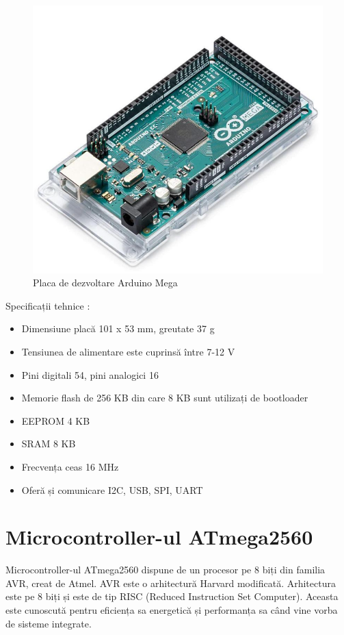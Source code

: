 \begin{figure}[H]
\includegraphics[width=0.7\linewidth]{images/arduino_mega.png}
\caption{Placa de dezvoltare Arduino Mega \cite{mega_poza}}
\label{fig:arduino_mega}
\end{figure}

Specificații tehnice \cite{mega_datasheet}:

\begin{itemize}
  \item Dimensiune placă 101 x 53 mm, greutate 37 g
  \item Tensiunea de alimentare este cuprinsă între 7-12 V
  \item Pini digitali 54, pini analogici 16
  \item Memorie flash de 256 KB din care 8 KB sunt utilizați de bootloader
  \item EEPROM 4 KB
  \item SRAM 8 KB
  \item Frecvența ceas 16 MHz
  \item Oferă și comunicare I2C, USB, SPI, UART
\end{itemize}

\section{Microcontroller-ul ATmega2560}
Microcontroller-ul ATmega2560 dispune de un procesor pe 8 biți din familia AVR, creat de Atmel. AVR este o arhitectură Harvard modificată. Arhitectura este pe 8 biți și este de tip RISC (Reduced Instruction Set Computer). Aceasta este cunoscută pentru eficiența sa energetică și performanța sa când vine vorba de sisteme integrate.

